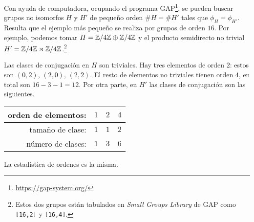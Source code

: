 \begin{ejemplo}
  Con ayuda de computadora, ocupando el programa
  GAP\footnote{\url{https://gap-system.org/}}, se pueden buscar grupos no
  isomorfos $H$ y $H'$ de pequeño orden $\# H = \# H'$ tales que
  $\phi_H = \phi_{H'}$. Resulta que el ejemplo más pequeño se realiza por grupos
  de orden $16$. Por ejemplo, podemos tomar $H = \mathbb{Z}/4\mathbb{Z} \oplus \mathbb{Z}/4\mathbb{Z}$ y el
  producto semidirecto no trivial
  $H' = \mathbb{Z}/4\mathbb{Z} \rtimes \mathbb{Z}/4\mathbb{Z}$.\footnote{Estos dos grupos están tabulados en
    \emph{Small Groups Library} de GAP como \texttt{[16,2]} y \texttt{[16,4]}.}

  Las clases de conjugación en $H$ son triviales. Hay tres elementos de orden
  $2$: estos son $(0,2)$, $(2,0)$, $(2,2)$. El resto de elementos no triviales
  tienen orden $4$, en total son $16 - 3 - 1 = 12$. Por otra parte, en $H'$ las
  clases de conjugación son las siguientes.

  \begin{center}
    \renewcommand{\arraystretch}{1.5}
    \begin{tabular}{rccc}
      \hline
      orden de elementos: & $1$ & $2$ & $4$ \\
      \hline
      tamaño de clase: & $1$ & $1$ & $2$ \\
      \hline
      número de clases: & $1$ & $3$ & $6$ \\
      \hline
    \end{tabular}
  \end{center}
  La estadística de ordenes es la misma. \qedhere
\end{ejemplo}

